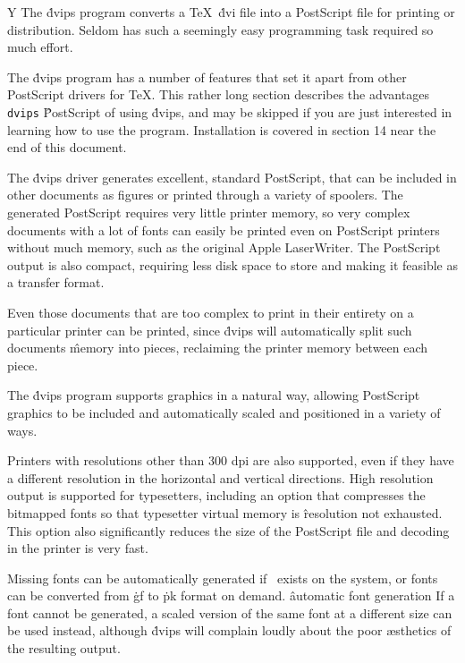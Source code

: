 %
%
\newif\ifgeneric\genericfalse
\ifx\ntmanloaded Y\else \fi %
%
%
The \.{dvips} program converts a \TeX\ \.{dvi} file into a PostScript file
for printing or distribution.  Seldom has such a seemingly easy programming
task required so much effort.



The \.{dvips} program has a number of features that set it apart from other
PostScript drivers for \TeX.  This rather long section describes the advantages
\^{{\tt dvips}}
\^{PostScript}
of using \.{dvips}, and may be skipped if you are just interested in learning
how to use the program.  Installation is covered in section 14 near the
end of this document.

The \.{dvips} driver generates excellent, standard PostScript, that can be
included in other documents as figures or printed through a variety of
spoolers.  The generated PostScript requires very little printer memory,
so very complex documents with a lot of fonts can easily be printed even
on PostScript printers without much memory, such as the original Apple
LaserWriter.  The PostScript output is also compact, requiring less disk
space to store and making it feasible as a transfer format.

Even those documents that are too complex to print in their entirety
on a particular printer
can be printed, since \.{dvips} will automatically split such documents
\^{memory}
into pieces, reclaiming the printer memory between each piece.

The \.{dvips} program supports graphics in a natural way, allowing PostScript
graphics to be included and automatically scaled and positioned in a variety
of ways.

Printers with resolutions other than 300 dpi are also supported, even if they
have a different resolution in the horizontal and vertical directions.
High resolution output is supported for typesetters, including an option
that compresses the bitmapped fonts so that typesetter virtual memory is
\^{resolution}
not exhausted.  This option also significantly reduces the size of the
PostScript file and decoding in the printer is very fast.

Missing fonts can be automatically generated if \MF\ exists on the system,
or fonts can be converted from \.{gf} to \.{pk} format on demand.
\^{automatic font generation}
If a font cannot be generated, a scaled version of the same font at a
different size can be used instead, although \.{dvips} will complain
loudly about the poor \ae sthetics of the resulting output.

